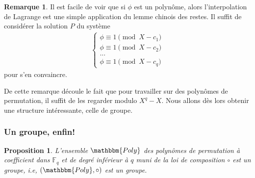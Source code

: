 \documentclass[12pt]{article}
\newcommand{\Fq}{\mathds{F}_q}
\newtheorem{prop}{Proposition}
\theoremstyle{definition}
\newtheorem{rem}{Remarque}
\begin{document}
\begin{rem}
Il est facile de voir que si $\phi $ est un polynôme, alors l'interpolation de Lagrange est une simple application du lemme chinois des restes. \newline
Il suffit de considérer la solution $P$ du système
	\begin{align*}
		\begin{cases}
			\phi \equiv 1 \pmod{X - c_1} \\
			\phi \equiv 1 \pmod{X - c_2} \\
			... \\
			\phi \equiv 1 \pmod{X - c_q}
  		\end{cases}
	\end{align*}
pour s'en convaincre.
\end{rem}

De cette remarque découle le fait que pour travailler sur des polynômes de permutation, il suffit de les regarder modulo $X^q - X$. Nous allons dès lors obtenir une structure intéressante, celle de groupe.

\subsubsection{Un groupe, enfin!} 

\begin{prop}
L'ensemble $\mathbbm{Poly}$ des polynômes de permutation  à coefficient dans $\Fq$ et de degré inférieur à $q$ muni de la loi de composition $\circ$ est un groupe, i.e, $(\mathbbm{Poly}, \circ)$ est un groupe.
\end{prop}
\end{document}
